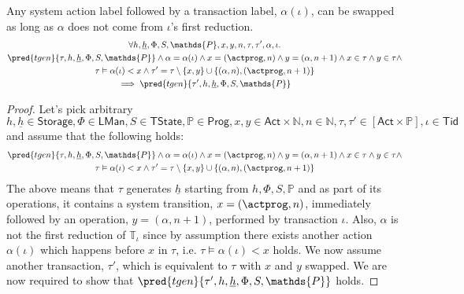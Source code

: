 \begin{lem}
	\label{lem:sysSwap}
	Any system action label followed by a transaction label, $\alpha(\iota)$, can be swapped as long as $\alpha$ does not come from $\iota$'s first reduction.
	\begin{gather}
		\forall h, \underline{h}, \Phi, S, \mathds{P}, x, y, n, \tau, \tau', \alpha, \iota \ldotp \\
		\pred{tgen}{\tau, h, \underline{h}, \Phi, S, \mathds{P}} \land \alpha = \alpha(\iota) \land x = (\actprog, n) \land y = (\alpha, n + 1) \land x \in \tau \land y \in \tau \land \\
		\tau \vDash \alpha(\iota) < x \land \tau' = \tau \setminus \{ x, y \} \cup \{ (\alpha, n), (\actprog, n+1) \} \\
		\implies
		\pred{tgen}{\tau', h, \underline{h}, \Phi, S, \mathds{P}}
	\end{gather}
	
	\begin{proof}
	Let's pick arbitrary $h, \underline{h} \in \mathsf{Storage}, \Phi \in \mathsf{LMan}, S \in \mathsf{TState}, \mathds{P} \in \mathsf{Prog}, x, y \in \mathsf{Act} \times \mathds{N}, n \in \mathds{N}, \tau, \tau' \in [\mathsf{Act} \times \mathds{P}], \iota \in \mathsf{Tid}$ and assume that the following holds:
	\begin{gather}
		\pred{tgen}{\tau, h, \underline{h}, \Phi, S, \mathds{P}} \land \alpha = \alpha(\iota) \land x = (\actprog, n) \land y = (\alpha, n + 1) \land x \in \tau \land y \in \tau \land \\
		\tau \vDash \alpha(\iota) < x \land \tau' = \tau \setminus \{ x, y \} \cup \{ (\alpha, n), (\actprog, n+1) \}
	\end{gather}
	The above means that $\tau$ generates $\underline{h}$ starting from $h, \Phi, S, \mathds{P}$ and as part of its operations, it contains a system transition, $x = (\actprog, n)$, immediately followed by an operation, $y = (\alpha, n+1)$, performed by transaction $\iota$. Also, $\alpha$ is not the first reduction of $\mathds{T}_\iota$ since by assumption there exists another action $\alpha(\iota)$ which happens before $x$ in $\tau$, i.e. $\tau \vDash \alpha(\iota) < x$ holds. We now assume another transaction, $\tau'$, which is equivalent to $\tau$ with $x$ and $y$ swapped. We are now required to show that $\pred{tgen}{\tau', h, \underline{h}, \Phi, S, \mathds{P}}$ holds.
	

\end{proof}
\end{lem}
